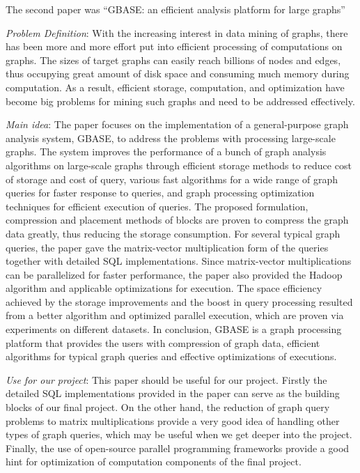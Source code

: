 \newpage
The second paper was ``GBASE: an efficient analysis platform for large graphs''
\begin{itemize*}
\item {\em Problem Definition}: With the increasing interest in data mining of graphs, there has been more and more effort put into efficient processing of computations on graphs. The sizes of target graphs can easily reach billions of nodes and edges, thus occupying great amount of disk space and consuming much memory during computation. As a result, efficient storage, computation, and optimization have become big problems for mining such graphs and need to be addressed effectively.\\

\item {\em Main idea}: The paper focuses on the implementation of a general-purpose graph analysis system, GBASE, to address the problems with processing large-scale graphs. The system improves the performance of a bunch of graph analysis algorithms on large-scale graphs through efficient storage methods to reduce cost of storage and cost of query, various fast algorithms for a wide range of graph queries for faster response to queries, and graph processing optimization techniques for efficient execution of queries. The proposed formulation, compression and placement methods of blocks are proven to compress the graph data greatly, thus reducing the storage consumption. For several typical graph queries, the paper gave the matrix-vector multiplication form of the queries together with detailed SQL implementations. Since matrix-vector multiplications can be parallelized for faster performance, the paper also provided the Hadoop algorithm and applicable optimizations for execution. The space efficiency achieved by the storage improvements and the boost in query processing resulted from a better algorithm and optimized parallel execution, which are proven via experiments on different datasets. In conclusion, GBASE is a graph processing platform that provides the users with compression of graph data, efficient algorithms for typical graph queries and effective optimizations of executions.\\
\item {\em Use for our project}:
      This paper should be useful for our project. Firstly the detailed SQL implementations provided in the paper can serve as the building blocks of our final project. On the other hand, the reduction of graph query problems to matrix multiplications provide a very good idea of handling other types of graph queries, which may be useful when we get deeper into the project. Finally, the use of open-source parallel programming frameworks provide a good hint for optimization of computation components of the final project.\\

\end{itemize*}
